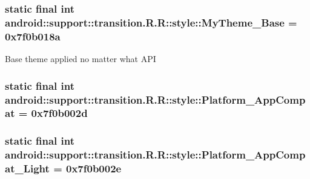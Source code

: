 \hypertarget{classandroid_1_1support_1_1transition_1_1_r_1_1style_35ac0ef8a54cb068bbe4f5d9e5da3c95}{
\subsubsection[{MyTheme\_\-Base}]{\setlength{\rightskip}{0pt plus 5cm}static final int android::support::transition.R.R::style::MyTheme\_\-Base = 0x7f0b018a}}
\label{classandroid_1_1support_1_1transition_1_1_r_1_1style_35ac0ef8a54cb068bbe4f5d9e5da3c95}


Base theme applied no matter what API \hypertarget{classandroid_1_1support_1_1transition_1_1_r_1_1style_bdbb9c2047e5368f2306f69754fb1bf6}{
\subsubsection[{Platform\_\-AppCompat}]{\setlength{\rightskip}{0pt plus 5cm}static final int android::support::transition.R.R::style::Platform\_\-AppCompat = 0x7f0b002d}}
\label{classandroid_1_1support_1_1transition_1_1_r_1_1style_bdbb9c2047e5368f2306f69754fb1bf6}


\hypertarget{classandroid_1_1support_1_1transition_1_1_r_1_1style_de958bb4550bb121e9e9ce7f9eb168ec}{
\subsubsection[{Platform\_\-AppCompat\_\-Light}]{\setlength{\rightskip}{0pt plus 5cm}static final int android::support::transition.R.R::style::Platform\_\-AppCompat\_\-Light = 0x7f0b002e}}
\label{classandroid_1_1support_1_1transition_1_1_r_1_1style_de958bb4550bb121e9e9ce7f9eb168ec}


